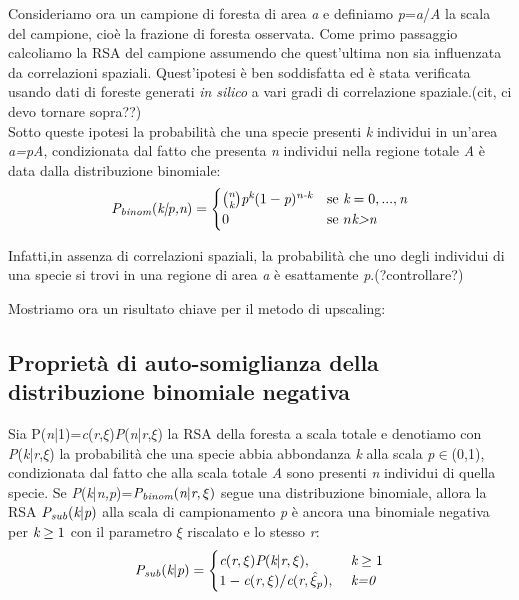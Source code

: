 Consideriamo ora un campione di foresta di area \emph{a} e definiamo \emph{p}=\emph{a}/\emph{A} la scala del campione, cioè la frazione di foresta osservata.
Come primo passaggio calcoliamo la RSA del campione assumendo che quest'ultima non sia influenzata da correlazioni spaziali. Quest'ipotesi è ben soddisfatta ed è stata verificata usando dati di foreste generati \emph{in silico} a vari gradi di correlazione spaziale.(cit, ci devo tornare sopra??)\\
Sotto queste ipotesi la probabilità che una specie presenti \emph{k} individui in un'area \emph{a=pA}, condizionata dal fatto che presenta \emph{n} individui nella regione totale \emph{A} è data dalla distribuzione binomiale:
\begin{equation}
\emph{P}_\emph{binom}(\emph{k|p,n})=\begin{cases} \binom{\emph{n}}{\emph{k}}\emph{p}^\emph{k}(1-\emph{p})^{\emph{n-k}} & \mbox{se }\emph{k}=0,...,\emph{n} \\ 0 & \mbox{se }n\mbox{\emph{k>n}}
\end{cases}
\end{equation}

Infatti,in assenza di correlazioni spaziali, la probabilità che uno degli individui di una specie si trovi in una regione di area \emph{a} è esattamente \emph{p}.(?controllare?)

Mostriamo ora un risultato chiave per il metodo di upscaling:
\subsection{Proprietà di auto-somiglianza della distribuzione binomiale negativa}
Sia P(\emph{n}|1)=\emph{c}(\emph{r},$\xi$)\emph{P}(\emph{n}|\emph{r},$\xi$) la RSA della foresta a scala totale e denotiamo con \emph{P}(\emph{k}|\emph{r},$\xi$) la probabilità che una specie abbia abbondanza \emph{k} alla scala \emph{p}$\in$(0,1), condizionata dal fatto che alla scala totale \emph{A} sono presenti \emph{n} individui di quella specie.
Se \emph{P}(\emph{k}|\emph{n,p})=$\emph{P}_\emph{binom}(\emph{n}|\emph{r},\xi)$ segue una distribuzione binomiale, allora la RSA $\emph{P}_\emph{sub}(\emph{k}|\emph{p})$ alla scala di campionamento \emph{p} è ancora una binomiale negativa per $\emph{k}\ge1$ con il parametro $\xi$ riscalato e lo stesso \emph{r}:
\begin{equation}
    \emph{P}_\emph{sub}(\emph{k}|\emph{p})=\begin{cases} \emph{c}(\emph{r},\xi)\emph{P}(\emph{k}|\emph{r},\xi), & \mbox{ }\emph{k}\ge1 \\ 1-\emph{c}(\emph{r},\xi)/\emph{c}(\emph{r},\hat\xi_{\emph{p}}), & \mbox{ }\mbox{\emph{k=0}}
    \end{cases}
\label{eq:RSAbinom}
\end{equation}

